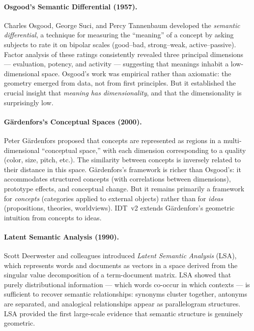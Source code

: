 \paragraph{Osgood's Semantic Differential (1957).}
Charles Osgood, George Suci, and Percy Tannenbaum developed the \emph{semantic
differential}, a technique for measuring the ``meaning'' of a concept by asking
subjects to rate it on bipolar scales (good--bad, strong--weak, active--passive).
Factor analysis of these ratings consistently revealed three principal
dimensions --- evaluation, potency, and activity --- suggesting that meanings
inhabit a low-dimensional space. Osgood's work was empirical rather than
axiomatic: the geometry emerged from data, not from first principles. But it
established the crucial insight that \emph{meaning has dimensionality}, and that
the dimensionality is surprisingly low.

\paragraph{G\"ardenfors's Conceptual Spaces (2000).}
Peter G\"ardenfors proposed that concepts are represented as regions in a
multi-dimensional ``conceptual space,'' with each dimension corresponding to a
quality (color, size, pitch, etc.). The similarity between concepts is inversely
related to their distance in this space. G\"ardenfors's framework is richer than
Osgood's: it accommodates structured concepts (with correlations between
dimensions), prototype effects, and conceptual change. But it remains primarily
a framework for \emph{concepts} (categories applied to external objects) rather
than for \emph{ideas} (propositions, theories, worldviews). IDT~v2 extends
G\"ardenfors's geometric intuition from concepts to ideas.

\paragraph{Latent Semantic Analysis (1990).}
Scott Deerwester and colleagues introduced \emph{Latent Semantic Analysis}
(LSA), which represents words and documents as vectors in a space derived from
the singular value decomposition of a term-document matrix. LSA showed that
purely distributional information --- which words co-occur in which contexts ---
is sufficient to recover semantic relationships: synonyms cluster together,
antonyms are separated, and analogical relationships appear as parallelogram
structures. LSA provided the first large-scale evidence that semantic structure
is genuinely geometric.

